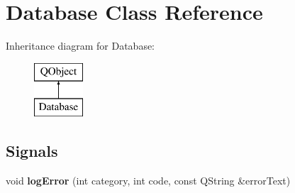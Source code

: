 \hypertarget{class_database}{}\section{Database Class Reference}
\label{class_database}
Inheritance diagram for Database\+:\begin{figure}[H]
\begin{center}
\leavevmode
\includegraphics[height=2.000000cm]{class_database}
\end{center}
\end{figure}
\subsection*{Signals}
\begin{DoxyCompactItemize}
\item 
\mbox{\label{class_database_ab65267ed41ba9a21b7f1abd5e738d2a0}} 
void {\bfseries log\+Error} (int category, int code, const Q\+String \&error\+Text)
\end{DoxyCompactItemize}
